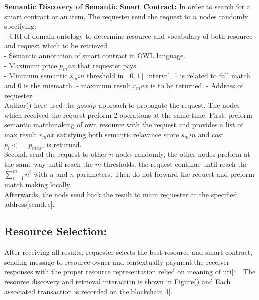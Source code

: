  \textbf{Semantic  Discovery of Semantic Smart Contract: }
 In order to search for a smart contract or an item, The requester send the request to $n$ nodes randomly specifying:\\
 - URI of domain ontology to determine resource and vocabulary of both resource and request which to be retrieved.\\
 - Semantic annotation of smart contract in OWL language. \\
 - Maximum price $p_max$ that requester pays.\\
 - Minimum semantic $s_min$ threshold in $[0,1]$ interval, 1 is related to full match and 0 is the mismatch. 
 - maximum result $r_max$ is to be returned.
 - Address of requester. \\ 
 Author() here used the $gossip$ approach to propagate the request. The nodes which received the request preform 2 operations at the same time: First, preform semantic matchmaking of own resource with the request and provides a list of max result $r_max$ satisfying both semantic relavance score $s_min$ and cost $p_i <= p_{max}$, is returned.\\
 Second, send the request to other $n$ nodes randomly, the other nodes preform at the same way until reach the $m$ thresholds. the request continue until reach the $\sum_{i=1}^{m} n^i$ with $n$ and $n$ parameters. Then do not forward the request and preform match making locally.\\
 Afterwards, the nods send back the result to main requester at the specified address[semdec].\\ 
 \subsection{Resource Selection:} After receiving all results, requester selects the best resource and smart contract, sending message to resource owner and contextually payment.the receiver responses with the proper resource representation relied on meaning of uri[4].
 The resource discovery and retrieval interaction is shown in Figure() and Each associated transaction is recorded on the blockchain[4].

